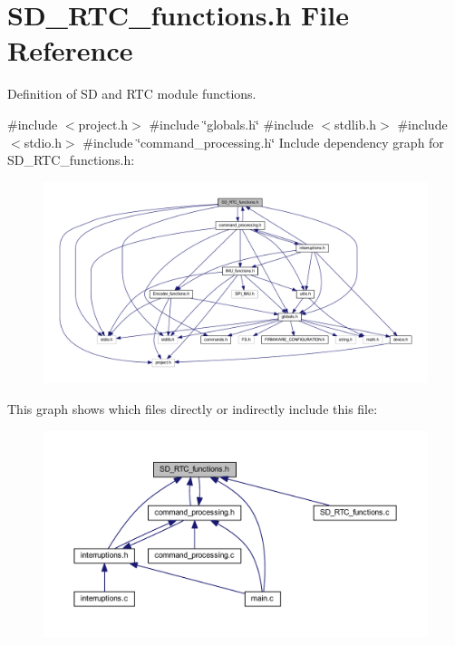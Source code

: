\section{S\+D\+\_\+\+R\+T\+C\+\_\+functions.\+h File Reference}
\label{_s_d___r_t_c__functions_8h}


Definition of SD and R\+TC module functions.  


{\ttfamily \#include $<$project.\+h$>$}\newline
{\ttfamily \#include \char`\"{}globals.\+h\char`\"{}}\newline
{\ttfamily \#include $<$stdlib.\+h$>$}\newline
{\ttfamily \#include $<$stdio.\+h$>$}\newline
{\ttfamily \#include \char`\"{}command\+\_\+processing.\+h\char`\"{}}\newline
Include dependency graph for S\+D\+\_\+\+R\+T\+C\+\_\+functions.\+h\+:\nopagebreak
\begin{figure}[H]
\begin{center}
\leavevmode
\includegraphics[width=350pt]{_s_d___r_t_c__functions_8h__incl}
\end{center}
\end{figure}
This graph shows which files directly or indirectly include this file\+:\nopagebreak
\begin{figure}[H]
\begin{center}
\leavevmode
\includegraphics[width=350pt]{_s_d___r_t_c__functions_8h__dep__incl}
\end{center}
\end{figure}
